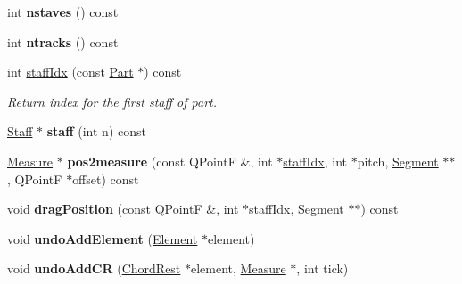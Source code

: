 \begin{DoxyCompactItemize}
\mbox{\label{class_ms_1_1_score_ab39888225a9fe0533558a379b1545cb1}} 
int {\bfseries nstaves} () const
\item 
\mbox{\label{class_ms_1_1_score_aa7ea8f4f050ba44ed0cf95ad4f5d3c06}} 
int {\bfseries ntracks} () const
\item 
\mbox{\label{class_ms_1_1_score_aa4353d2ea4660f134a9030dbf9216b25}} 
int \hyperlink{class_ms_1_1_score_aa4353d2ea4660f134a9030dbf9216b25}{staff\+Idx} (const \hyperlink{class_ms_1_1_part}{Part} $\ast$) const
\begin{DoxyCompactList}\small\item\em Return index for the first staff of {\itshape part}. \end{DoxyCompactList}\item 
\mbox{\label{class_ms_1_1_score_ad1de1c246a7f35e5b63781630e3c7d58}} 
\hyperlink{class_ms_1_1_staff}{Staff} $\ast$ {\bfseries staff} (int n) const
\item 
\mbox{\label{class_ms_1_1_score_a4c35c150fe004e1b2cb82cb2b87954a6}} 
\hyperlink{class_ms_1_1_measure}{Measure} $\ast$ {\bfseries pos2measure} (const Q\+PointF \&, int $\ast$\hyperlink{class_ms_1_1_score_aa4353d2ea4660f134a9030dbf9216b25}{staff\+Idx}, int $\ast$pitch, \hyperlink{class_ms_1_1_segment}{Segment} $\ast$$\ast$, Q\+PointF $\ast$offset) const
\item 
\mbox{\label{class_ms_1_1_score_aa3d8e1a8aa1e60f403ba25bc3d3913ad}} 
void {\bfseries drag\+Position} (const Q\+PointF \&, int $\ast$\hyperlink{class_ms_1_1_score_aa4353d2ea4660f134a9030dbf9216b25}{staff\+Idx}, \hyperlink{class_ms_1_1_segment}{Segment} $\ast$$\ast$) const
\item 
\mbox{\label{class_ms_1_1_score_a88d1556bac485bde9b2d6ae3c1e6bd77}} 
void {\bfseries undo\+Add\+Element} (\hyperlink{class_ms_1_1_element}{Element} $\ast$element)
\item 
\mbox{\label{class_ms_1_1_score_aa2ad7c34c11bcdbbe1ace3c81560e3c7}} 
void {\bfseries undo\+Add\+CR} (\hyperlink{class_ms_1_1_chord_rest}{Chord\+Rest} $\ast$element, \hyperlink{class_ms_1_1_measure}{Measure} $\ast$, int tick)

\end{DoxyCompactItemize}
